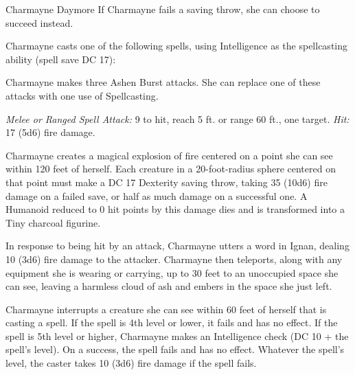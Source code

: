 \documentclass[10pt,a4paper,twoside,bg=print,twocolumn,openany,nodeprecatedcode]{dndbook}
\begin{document}
\begin{DndMonster}[float=t]{Charmayne Daymore}
\DndMonsterBasics[
armor-class = {12},
hit-points = {\DndDice{19d8 + 38}},
speed = {30 ft., fly 30 ft. \textit{(hover)}}
]
\DndMonsterAbilityScores[
 str = 8,
 dex = 14,
 con = 15,
 int = 20,
 wis = 14,
 cha = 16
]
\DndMonsterDetails[
saving-throws = {Int +9, Wis +6, Cha +7},
skills = {Arcana +9, Deception +7, Perception +6},
damage-immunities = {fire},
languages = {Common, Draconic, Elvish, Ignan},
challenge = 10,
]
If Charmayne fails a saving throw, she can choose to succeed instead.

Charmayne casts one of the following spells, using Intelligence as the spellcasting ability (spell save DC 17):
\begin{DndMonsterSpells}
\end{DndMonsterSpells}
Charmayne makes three Ashen Burst attacks. She can replace one of these attacks with one use of Spellcasting.

\textsl{Melee or Ranged Spell Attack:} 9 to hit, reach 5 ft. or range 60 ft., one target. \textsl{Hit:} 17 (5d6) fire damage.

Charmayne creates a magical explosion of fire centered on a point she can see within 120 feet of herself. Each creature in a 20-foot-radius sphere centered on that point must make a DC 17 Dexterity saving throw, taking 35 (10d6) fire damage on a failed save, or half as much damage on a successful one. A Humanoid reduced to 0 hit points by this damage dies and is transformed into a Tiny charcoal figurine.

In response to being hit by an attack, Charmayne utters a word in Ignan, dealing 10 (3d6) fire damage to the attacker. Charmayne then teleports, along with any equipment she is wearing or carrying, up to 30 feet to an unoccupied space she can see, leaving a harmless cloud of ash and embers in the space she just left.

Charmayne interrupts a creature she can see within 60 feet of herself that is casting a spell. If the spell is 4th level or lower, it fails and has no effect. If the spell is 5th level or higher, Charmayne makes an Intelligence check (DC 10 + the spell's level). On a success, the spell fails and has no effect. Whatever the spell's level, the caster takes 10 (3d6) fire damage if the spell fails.

\end{DndMonster}
\end{document}
